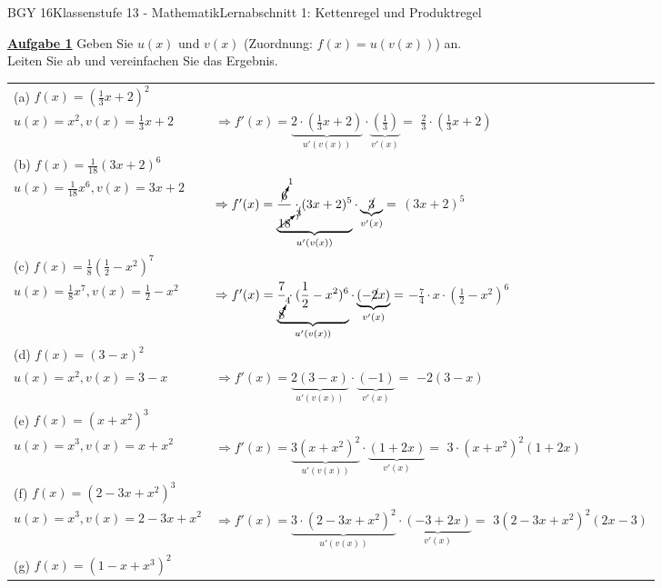 \documentclass[oneside,openany,headings=optiontotoc,11pt,numbers=noenddot]{scrreprt}
\begin{document}
	\begin{worksheet}{BGY 16}{Klassenstufe 13 - Mathematik}{Lernabschnitt 1: Kettenregel und Produktregel}
				
		\noindent
		\sffamily
		\begin{framed}
			\noindent
			\textbf{\underline{Aufgabe 1}} Geben Sie \(u(x)\) und \(v(x)\) (Zuordnung: \(f(x) = u(v(x))\)) an.\\
			Leiten Sie ab und vereinfachen Sie das Ergebnis.\\
			\par
			\begin{tabularx}{\textwidth}{lX}
				(a) \(f(x)=(\frac{1}{3}x+2)^2\)\\
				\(u(x) = x^2, v(x) = \frac{1}{3}x+2\) & \(\Rightarrow f'(x) = \underbrace{2\cdot{}(\frac{1}{3}x+2)}_{u'(v(x))}\cdot\underbrace{(\frac{1}{3})}_{v'(x)} =\) \colorbox{green!10}{\(\frac{2}{3}\cdot(\frac{1}{3}x+2)\)}\\
				(b) \(f(x) = \frac{1}{18}(3x+2)^6\)\\
				\(u(x) = \frac{1}{18}x^6, v(x) = 3x+2\) & \( \Rightarrow f'(x) = \underbrace{\frac{\cancelto{1}{6}}{\cancelto{\cancel{3}}{18}}\cdot(3x+2)^5}_{u'(v(x))}\cdot\underbrace{\cancel{3}}_{v'(x)} =\) \colorbox{green!10}{\((3x+2)^5\)}\\
				(c) \(f(x) = \frac{1}{8}(\frac{1}{2} -x^2)^7\)\\
				\(u(x) = \frac{1}{8}x^7, v(x) = \frac{1}{2}-x^2\) & \(\Rightarrow f'(x) = \underbrace{\frac{7}{\cancelto{4}{8}}\cdot(\frac{1}{2}-x^2)^6}_{u'(v(x))}\cdot\underbrace{(-\cancel{2}x)}_{v'(x)} =\) \colorbox{green!10}{\(-\frac{7}{4}\cdot{}x\cdot(\frac{1}{2}-x^2)^6\)}\\
				(d) \(f(x) = (3-x)^2\)\\
				\(u(x) = x^2, v(x) = 3-x\) & \(\Rightarrow f'(x) = \underbrace{2(3-x)}_{u'(v(x))}\cdot\underbrace{(-1)}_{v'(x)} =\) \colorbox{green!10}{\(-2(3-x)\)}\\
				(e) \(f(x) = (x+x^2)^3\)\\
				\(u(x) = x^3, v(x) = x+x^2\) & \(\Rightarrow f'(x) = \underbrace{3(x+x^2)^2}_{u'(v(x))}\cdot\underbrace{(1+2x)}_{v'(x)} =\) \colorbox{green!10}{\(3\cdot(x+x^2)^2(1+2x)\)}\\
				(f) \(f(x) = (2-3x+x^2)^3\)\\
				\(u(x) = x^3, v(x) = 2-3x+x^2\) & \(\Rightarrow f'(x) = \underbrace{3\cdot(2-3x+x^2)^2}_{u'(v(x))}\cdot\underbrace{(-3+2x)}_{v'(x)} =\) \colorbox{green!10}{\(3(2-3x+x^2)^2(2x-3)\)}\\
				(g) \(f(x) = (1-x+x^3)^2\)\\

\end{tabularx}
\end{framed}
\end{worksheet}
\end{document}
